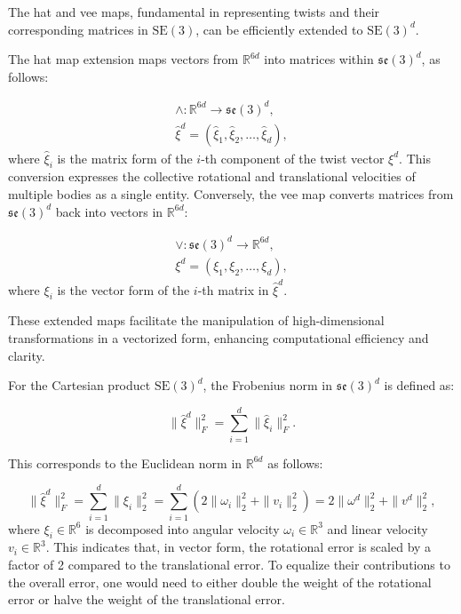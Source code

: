 The hat and vee maps, fundamental in representing twists and their corresponding matrices in \(\mathrm{SE}(3)\), can be efficiently extended to \(\mathrm{SE}(3)^d\).

The hat map extension maps vectors from \(\mathbb{R}^{6d}\) into matrices within \(\mathfrak{se}(3)^d\), as follows:

\begin{equation}
    \begin{aligned}
    \wedge : \mathbb{R}^{6d} \rightarrow \mathfrak{se}(3)^d, \\
    \hat{\xi}^d = (\hat{\xi}_1, \hat{\xi}_2, \dots, \hat{\xi}_d),
    \end{aligned}
\end{equation}
where \(\hat{\xi}_i\) is the matrix form of the \(i\)-th component of the twist vector \(\xi^d\). This conversion expresses the collective rotational and translational velocities of multiple bodies as a single entity. Conversely, the vee map converts matrices from \(\mathfrak{se}(3)^d\) back into vectors in \(\mathbb{R}^{6d}\):

\begin{equation}
    \begin{aligned}
        \vee : \mathfrak{se}(3)^d \rightarrow \mathbb{R}^{6d}, \\
        \xi^d = (\xi_1, \xi_2, \dots, \xi_d),
    \end{aligned}
\end{equation}
where \(\xi_i\) is the vector form of the \(i\)-th matrix in \(\hat{\xi}^d\). 

These extended maps facilitate the manipulation of high-dimensional transformations in a vectorized form, enhancing computational efficiency and clarity. 


For the Cartesian product \(\mathrm{SE}(3)^d\), the Frobenius norm in \(\mathfrak{se}(3)^d\) is defined as:

\begin{equation}
    \|\hat{\xi}^d\|_F^2 = \sum_{i=1}^d \|\hat{\xi}_i\|_F^2.
\end{equation}

This corresponds to the Euclidean norm in \(\mathbb{R}^{6d}\) as follows:

\begin{equation}
    \|\hat{\xi}^d\|_F^2 
    = \sum_{i=1}^d \|\xi_i\|_2^2 
    = \sum_{i=1}^d \left(2\|\omega_i\|_2^2 + \|v_i\|_2^2\right)
    = 2 \|\omega^d\|_2^2 + \|v^d\|_2^2,
    \label{eq:norm_SE3d}
\end{equation}
where \(\xi_i \in \mathbb{R}^6\) is decomposed into angular velocity \(\omega_i \in \mathbb{R}^3\) and linear velocity \(v_i \in \mathbb{R}^3\). This indicates that, in vector form, the rotational error is scaled by a factor of 2 compared to the translational error. To equalize their contributions to the overall error, one would need to either double the weight of the rotational error or halve the weight of the translational error.